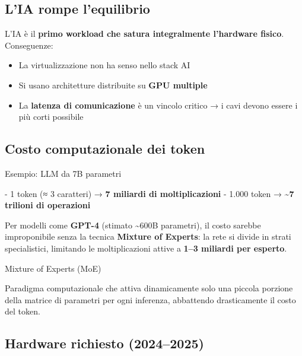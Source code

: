 \documentclass[
  italian,
  openany]{book}
\providecommand{\tightlist}{%
  \setlength{\itemsep}{0pt}\setlength{\parskip}{0pt}}
\begin{document}
\subsection{L'IA rompe l'equilibrio}\label{lia-rompe-lequilibrio}

L'IA è il \textbf{primo workload che satura integralmente l'hardware
fisico}. Conseguenze:

\begin{itemize}
\tightlist
\item
  La virtualizzazione non ha senso nello stack AI
\item
  Si usano architetture distribuite su \textbf{GPU multiple}
\item
  La \textbf{latenza di comunicazione} è un vincolo critico → i cavi
  devono essere i più corti possibile
\end{itemize}

\subsection{Costo computazionale dei
token}\label{costo-computazionale-dei-token}

\begin{callouttip}{Esempio: LLM da 7B parametri}

- 1 token (≈ 3 caratteri) → \textbf{7 miliardi di moltiplicazioni} -
1.000 token → \textbf{\textasciitilde7 trilioni di operazioni}

\end{callouttip}

Per modelli come \textbf{GPT-4} (stimato \textasciitilde600B parametri),
il costo sarebbe improponibile senza la tecnica \textbf{Mixture of
Experts}: la rete si divide in strati specialistici, limitando le
moltiplicazioni attive a \textbf{1--3 miliardi per esperto}.

\begin{calloutnote}{Mixture of Experts (MoE)}

Paradigma computazionale che attiva dinamicamente solo una piccola
porzione della matrice di parametri per ogni inferenza, abbattendo
drasticamente il costo del token.

\end{calloutnote}

\subsection{Hardware richiesto
(2024--2025)}\label{hardware-richiesto-20242025}
\end{document}
